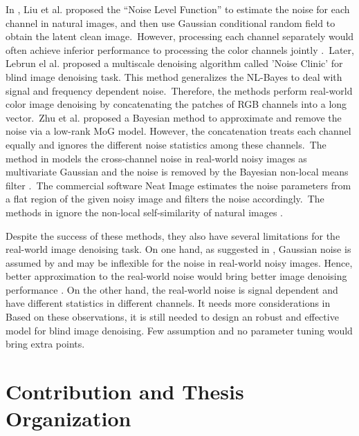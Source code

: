 In \cite{Liu2008}, Liu et al. proposed the ``Noise Level Function'' to estimate the noise for each channel in natural images, and then use Gaussian conditional random field to obtain the latent clean image.\ However, processing each channel separately would often achieve inferior performance to processing the color channels jointly \cite{mairal2008sparse}.\ Later, Lebrun el al. proposed a multiscale denoising algorithm called 'Noise Clinic' \cite{noiseclinic} for blind image denoising task. This method generalizes the NL-Bayes \cite{nlbayes} to deal with signal and frequency dependent noise.\ Therefore, the methods \cite{noiseclinic,ncwebsite,Zhu_2016_CVPR} perform real-world color image denoising by concatenating the patches of RGB channels into a long vector.\ Zhu et al. \cite{Zhu_2016_CVPR} proposed a Bayesian method to approximate and remove the noise via a low-rank MoG model. However, the concatenation treats each channel equally and ignores the different noise statistics among these channels.\ The method in \cite{crosschannel2016} models the cross-channel noise in real-world noisy images as multivariate Gaussian and the noise is removed by the Bayesian non-local means filter \cite{kervrann2007bayesian}.\ The commercial software Neat Image \cite{neatimage} estimates the noise parameters from a flat region of the given noisy image and filters the noise accordingly.\ The methods in \cite{crosschannel2016,neatimage} ignore the non-local self-similarity of natural images \cite{nlm}. 


Despite the success of these methods, they also have several limitations for the real-world image denoising task. On one hand, as suggested in \cite{Liu2008,noiseclinic}, Gaussian noise is assumed by \cite{fullyblind,rabie2005robust,Liu2008} and may be inflexible for the noise in real-world noisy images. Hence, better approximation to the real-world noise would bring better image denoising performance \cite{Liu2008,noiseclinic}. On the other hand, the real-world noise is signal dependent and have different statistics in different channels. It needs more considerations in  Based on these observations, it is still needed to design an robust and effective model for blind image denoising. Few assumption and no parameter tuning would bring extra points.


\section{Contribution and Thesis Organization}
\label{sec:intro:new}

